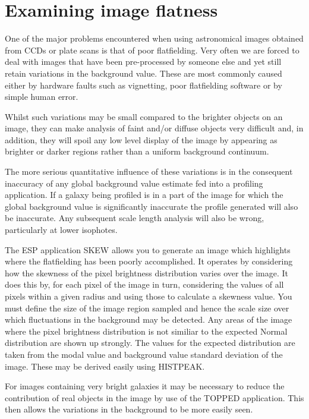 \documentclass[twoside,11pt]{article}
\begin{document}
\section{Examining image flatness}
\label{sec:examining}

One of the major problems encountered when using astronomical images 
obtained from CCDs or plate scans is that of poor flatfielding. Very often
we are forced to deal with images that have been pre-processed by
someone else and yet still retain variations in the background value.
These are most commonly caused either by hardware faults such as vignetting, 
poor flatfielding software or by simple human error. 

Whilst such variations may be small compared to the brighter
objects on an image, they can make analysis of faint and/or diffuse objects
very difficult and, in addition, they will spoil any low level display of the 
image by appearing as brighter or darker regions rather than a uniform
background continuum. 

The more serious quantitative influence of these variations is in
the consequent inaccuracy of any global background value estimate fed into a 
profiling application. If a galaxy being profiled is in a part of the image for 
which the global background value is significantly inaccurate the profile
generated will also be inaccurate. Any subsequent scale length analysis
will also be wrong, particularly at lower isophotes.

The ESP application SKEW allows you to generate an image which highlights
where the flatfielding has been poorly accomplished.
It operates by considering how the skewness of the pixel brightness distribution
varies over the image. It does this by, for each pixel of the image in turn, 
considering the values of all pixels within a given radius and using those to 
calculate a skewness value. You must define the size of the image region 
sampled and hence the scale size over which fluctuations in the background 
may be detected. Any areas of the image where the pixel brightness distribution
is not similiar to the expected Normal distribution are shown up strongly.
The values for the expected distribution are taken from the modal value 
and background value standard deviation of the image. These may be derived easily
using HISTPEAK.

For images containing very bright galaxies it may be necessary to reduce the 
contribution of real objects in the image by use of the TOPPED application. 
This then allows the variations in the background to be 
more easily seen.
\end{document}
